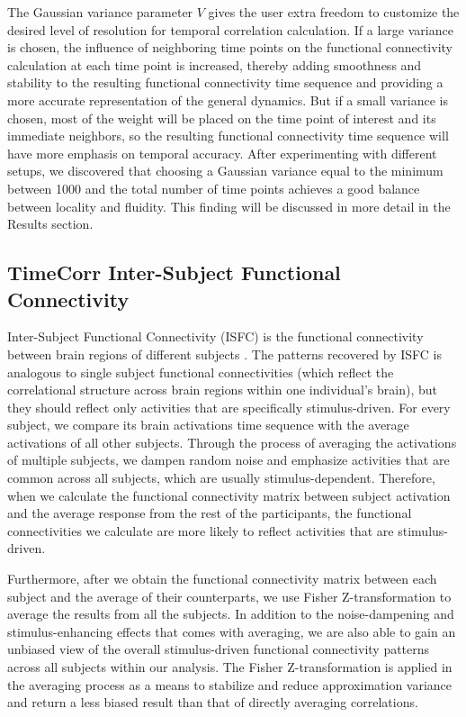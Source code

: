 \documentclass[11pt]{article}
\begin{document}
The Gaussian variance parameter $V$ gives the user extra freedom to customize the desired level of resolution for temporal correlation calculation. If a large variance is chosen, the influence of neighboring time points on the functional connectivity calculation at each time point is increased, thereby adding smoothness and stability to the resulting functional connectivity time sequence and providing a more accurate representation of the general dynamics. But if a small variance is chosen, most of the weight will be placed on the time point of interest and its immediate neighbors, so the resulting functional connectivity time sequence will have more emphasis on temporal accuracy. After experimenting with different setups, we discovered that choosing a Gaussian variance equal to the minimum between 1000 and the total number of time points achieves a good balance between locality and fluidity. This finding will be discussed in more detail in the Results section.

\subsection{TimeCorr Inter-Subject Functional Connectivity}

Inter-Subject Functional Connectivity (ISFC) is the functional connectivity between brain regions of different subjects \citep{jeremy2017,hasson2016}. The patterns recovered by ISFC is analogous to single subject functional connectivities (which reflect the correlational structure across brain regions within one individual's
brain), but they should reflect only activities that are specifically stimulus-driven. For every subject, we compare its brain activations time sequence with the average activations of all other subjects. Through the process of averaging the activations of multiple subjects, we dampen random noise and emphasize activities that are common across all subjects, which are usually stimulus-dependent. Therefore, when we calculate the functional connectivity matrix between subject activation and the average response from the rest of the participants, the functional connectivities we calculate are more likely to reflect activities that are stimulus-driven.

Furthermore, after we obtain the functional connectivity matrix between each subject and the average of their counterparts, we use Fisher Z-transformation to average the results from all the subjects. In addition to the noise-dampening and stimulus-enhancing effects that comes with averaging, we are also able to gain an unbiased view of the overall stimulus-driven functional connectivity patterns across all subjects within our analysis. The Fisher Z-transformation is applied in the averaging process as a means to stabilize and reduce approximation variance and return a less biased result than that of directly averaging correlations.
\end{document}
